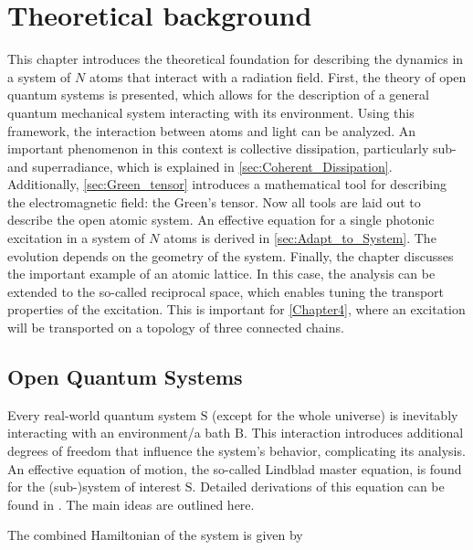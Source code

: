 \chapter{Theoretical background}
\label{Chapter2}

\noindent
This chapter introduces the theoretical foundation
for describing the dynamics in a system of $N$ atoms that interact with a radiation field.
First, the theory of open quantum systems is presented, which allows for the description of a general quantum mechanical system interacting with its environment.
Using this framework, the interaction between atoms and light can be analyzed.
An important phenomenon in this context is collective dissipation, particularly sub- and superradiance, which is explained in \autoref{sec:Coherent_Dissipation}.
Additionally, \autoref{sec:Green_tensor} introduces a mathematical tool for describing the electromagnetic field: the Green's tensor.
Now all tools are laid out to describe the open atomic system.
An effective equation for a single photonic excitation in a system of $N$ atoms is derived in \autoref{sec:Adapt_to_System}.
The evolution depends on the geometry of the system.
Finally, the chapter discusses the important example of an atomic lattice.
In this case, the analysis can be extended to the so-called reciprocal space, which enables tuning the transport properties of the excitation.
This is important for \autoref{Chapter4}, where an excitation will be transported on a topology of three connected chains.



\section{\textbf{O}pen \textbf{Q}uantum \textbf{S}ystems} \label{sec:OQS}
Every real-world quantum system $\text{S}$ (except for the whole universe) is inevitably interacting with an environment/a bath $\text{B}$.
This interaction introduces additional degrees of freedom that influence the system's behavior, complicating its analysis.
An effective equation of motion, the so-called Lindblad master equation, is found for the (sub-)system of interest $\text{S}$.
Detailed derivations of this equation can be found in \cite{Breuer2002, Manzano_2020}.
The main ideas are outlined here.

\noindent
The combined Hamiltonian of the system is given by

